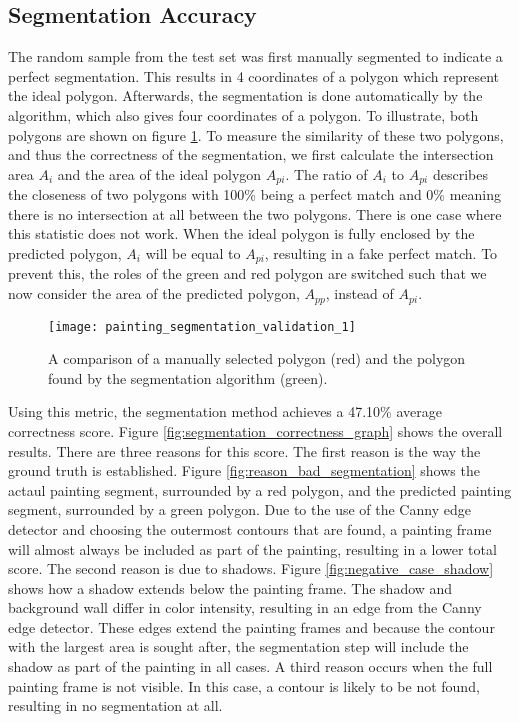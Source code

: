 \subsection{Segmentation Accuracy}
The random sample from the test set was first manually segmented to indicate a perfect segmentation. This results in 4 coordinates of a polygon which represent the ideal polygon. Afterwards, the segmentation is done automatically by the algorithm, which also gives four coordinates of a polygon. To illustrate, both polygons are shown on figure \ref{fig:painting_segmentation_validation_1}.
To measure the similarity of these two polygons, and thus the correctness of the segmentation, we first calculate the intersection area $A_i$ and the area of the ideal polygon $A_{pi}$. The ratio of $A_i$ to $A_{pi}$ describes the closeness of two polygons with 100\% being a perfect match and 0\% meaning there is no intersection at all between the two polygons. There is one case where this statistic does not work. When the ideal polygon is fully enclosed by the predicted polygon, $A_i$ will be equal to $A_{pi}$, resulting in a fake perfect match. To prevent this, the roles of the green and red polygon are switched such that we now consider the area of the predicted polygon, $A_{pp}$, instead of $A_{pi}$.
\begin{figure}
	\centering
	\texttt{[image: painting\_segmentation\_validation\_1]}
	\caption{A comparison of a manually selected polygon (red) and the polygon found by the segmentation algorithm (green).}
	\label{fig:painting_segmentation_validation_1}
\end{figure}


Using this metric, the segmentation method achieves a 47.10\% average correctness score. Figure \ref{fig:segmentation_correctness_graph} shows the overall results. There are three reasons for this score. The first reason is the way the ground truth is established. Figure \ref{fig:reason_bad_segmentation} shows the actaul painting segment, surrounded by a red polygon, and the predicted painting segment, surrounded by a green polygon. Due to the use of the Canny edge detector and choosing the outermost contours that are found, a painting frame will almost always be included as part of the painting, resulting in a lower total score. The second reason is due to shadows. Figure \ref{fig:negative_case_shadow} shows how a shadow extends below the painting frame. The shadow and background wall differ in color intensity, resulting in an edge from the Canny edge detector. These edges extend the painting frames and because the contour with the largest area is sought after, the segmentation step will include the shadow as part of the painting in all cases. A third reason occurs when the full painting frame is not visible. In this case, a contour is likely to be not found, resulting in no segmentation at all.


